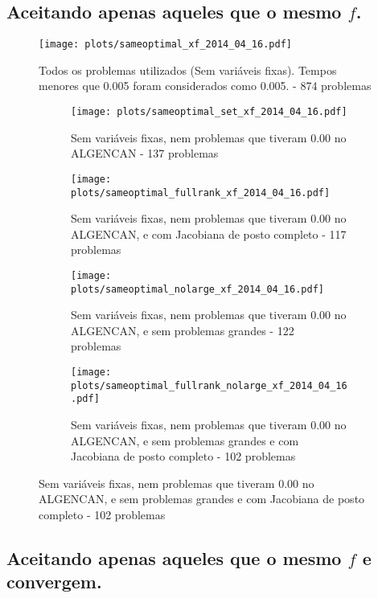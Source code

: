 \documentclass{article}
\begin{document}
\subsection{Aceitando apenas aqueles que o mesmo $f$. }

\begin{figure}[H]
  \centering
  \texttt{[image: plots/sameoptimal\_xf\_2014\_04\_16.pdf]}
  \caption{Todos os problemas utilizados (Sem variáveis fixas). Tempos menores
    que 0.005 foram considerados como 0.005. - 874 problemas}
\end{figure}
\begin{figure}[H]
  \centering
  \begin{subfigure}{0.48\textwidth}
    \texttt{[image: plots/sameoptimal\_set\_xf\_2014\_04\_16.pdf]}
    \caption{Sem variáveis fixas, nem problemas
      que tiveram 0.00 no ALGENCAN - 137 problemas}
  \end{subfigure}
  \begin{subfigure}{0.48\textwidth}
    \texttt{[image: plots/sameoptimal\_fullrank\_xf\_2014\_04\_16.pdf]}
    \caption{Sem variáveis fixas, nem problemas
      que tiveram 0.00 no ALGENCAN, e com Jacobiana de posto completo - 117
      problemas}
  \end{subfigure}
  \begin{subfigure}{0.48\textwidth}
    \texttt{[image: plots/sameoptimal\_nolarge\_xf\_2014\_04\_16.pdf]}
    \caption{Sem variáveis fixas, nem problemas
      que tiveram 0.00 no ALGENCAN, e sem problemas grandes - 122 problemas}
  \end{subfigure}
  \begin{subfigure}{0.48\textwidth}
    \texttt{[image: plots/sameoptimal\_fullrank\_nolarge\_xf\_2014\_04\_16.pdf]}
    \caption{Sem variáveis fixas, nem problemas
      que tiveram 0.00 no ALGENCAN, e sem problemas grandes e com Jacobiana de
      posto completo - 102 problemas}
  \end{subfigure}
\end{figure}



\subsection{Aceitando apenas aqueles que o mesmo $f$ e convergem. }
\end{document}
